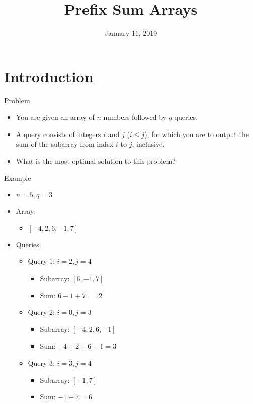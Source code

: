 \documentclass{beamer}
\title[Prefix Sum Arrays---Computer Science Club]{\textbf{Prefix Sum Arrays}}
\institute{Stephen Lewis Secondary School \\[3ex] {\large Computer Science Club}}
\date{January 11, 2019}
\begin{document}
\begin{frame} 
\titlepage 
\end{frame} 

\section{Introduction}

\begin{frame}{Problem}
\begin{itemize}
    \item You are given an array of $n$ numbers followed by $q$ queries.
    \item A query consists of integers $i$ and $j$ ($i \leq j$), for which you are to output the sum of the subarray from index $i$ to $j$, inclusive.
    \item What is the most optimal solution to this problem?
\end{itemize}
\end{frame}

\begin{frame}{Example}
    \begin{itemize}
        \item $n = 5, q = 3$
        \item Array:
        \begin{itemize}
            \item $[-4, 2, 6, -1, 7]$
        \end{itemize}
        
        \item Queries:
        \begin{itemize}
            \item Query 1: $i = 2, j = 4$
            \begin{itemize}
                \item Subarray: $[6, -1, 7]$
                \item Sum: $6 - 1 + 7 = 12$
            \end{itemize}
            
            \item Query 2: $i = 0, j = 3$
            \begin{itemize}
                \item Subarray: $[-4, 2, 6, -1]$
                \item Sum: $-4 + 2 + 6 - 1 = 3$
            \end{itemize}
            
            \item Query 3: $i = 3, j = 4$
            \begin{itemize}
                \item Subarray: $[-1, 7]$
                \item Sum: $-1 + 7 = 6$
            \end{itemize}
        \end{itemize}
    \end{itemize}
\end{frame}
\end{document}

